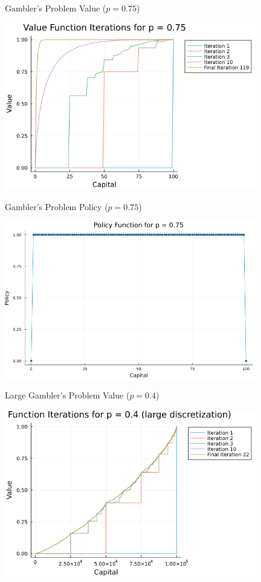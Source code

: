 \documentclass{beamer}
\begin{document}
\begin{frame}{Gambler's Problem Value ($p = 0.75$)}
\begin{center}
	\includegraphics[width=11cm]{gamblers_problem_value_p075.png}
		\end{center}
\end{frame}
\begin{frame}{Gambler's Problem Policy ($p = 0.75$)}
\begin{center}
	\includegraphics[width=11cm]{gamblers_problem_policy_p075.png}
		\end{center}
\end{frame}
\begin{frame}{Large Gambler's Problem Value ($p = 0.4$)}
\begin{center}
	\includegraphics[width=11cm]{gamblers_problem_value_p04large.png}
		\end{center}
\end{frame}
\end{document}
